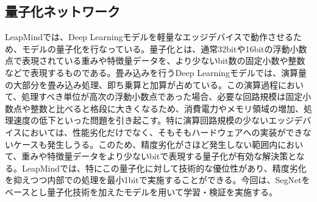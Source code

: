 \newpage

\subsection{量子化ネットワーク}
LeapMindでは、Deep Learningモデルを軽量なエッジデバイスで動作させるため、モデルの量子化を行なっている。量子化とは、通常32bitや16bitの浮動小数点で表現されている重みや特徴量データを、より少ないbit数の固定小数や整数などで表現するものである。畳み込みを行うDeep Learningモデルでは、演算量の大部分を畳み込み処理、即ち乗算と加算が占めている。この演算過程において、処理すべき単位が高次の浮動小数点であった場合、必要な回路規模は固定小数点や整数と比べると格段に大きくなるため、消費電力やメモリ領域の増加、処理速度の低下といった問題を引き起こす。特に演算回路規模の少ないエッジデバイスにおいては、性能劣化だけでなく、そもそもハードウェアへの実装ができないケースも発生しうる。このため、精度劣化がさほど発生しない範囲内において、重みや特徴量データをより少ないbitで表現する量子化が有効な解決策となる。LeapMindでは、特にこの量子化に対して技術的な優位性があり、精度劣化を抑えつつ内部での処理を最小1bitで実施することができる。今回は、SegNetをベースとし量子化技術を加えたモデルを用いて学習・検証を実施する。